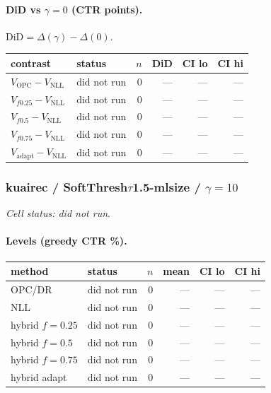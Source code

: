 \documentclass[10pt,a4paper]{article}
\begin{document}
\paragraph{DiD vs $\gamma=0$ (CTR points).} $\mathrm{DiD}=\Delta(\gamma)-\Delta(0)$.
{\centering\small\begin{tabular}{llrrrr}
\toprule contrast & status & $n$ & DiD & CI lo & CI hi \\
\midrule
$V_{\mathrm{OPC}}-V_{\mathrm{NLL}}$ & did not run & 0 & --- & --- & --- \\
$V_{f0.25}-V_{\mathrm{NLL}}$ & did not run & 0 & --- & --- & --- \\
$V_{f0.5}-V_{\mathrm{NLL}}$ & did not run & 0 & --- & --- & --- \\
$V_{f0.75}-V_{\mathrm{NLL}}$ & did not run & 0 & --- & --- & --- \\
$V_{\mathrm{adapt}}-V_{\mathrm{NLL}}$ & did not run & 0 & --- & --- & --- \\
\bottomrule\end{tabular}\par}
\bigskip
\subsubsection{kuairec / SoftThresh$\tau$1.5-mlsize / $\gamma=10$}
\emph{Cell status: did not run}.
\paragraph{Levels (greedy CTR \%).}
{\centering\small\begin{tabular}{llrrrr}
\toprule method & status & $n$ & mean & CI lo & CI hi \\
\midrule
OPC/DR & did not run & 0 & --- & --- & --- \\
NLL & did not run & 0 & --- & --- & --- \\
hybrid $f{=}0.25$ & did not run & 0 & --- & --- & --- \\
hybrid $f{=}0.5$ & did not run & 0 & --- & --- & --- \\
hybrid $f{=}0.75$ & did not run & 0 & --- & --- & --- \\
hybrid adapt & did not run & 0 & --- & --- & --- \\
\bottomrule\end{tabular}\par}
\end{document}
